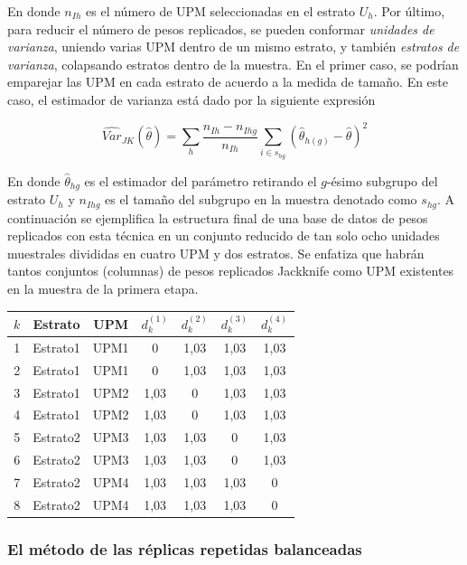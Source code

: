 \documentclass[
  12pt,
  spanish,
]{book}
\begin{document}
En donde \(n_{Ih}\) es el número de UPM seleccionadas en el estrato \(U_h\). Por último, para reducir el número de pesos replicados, se pueden conformar \emph{unidades de varianza}, uniendo varias UPM dentro de un mismo estrato, y también \emph{estratos de varianza}, colapsando estratos dentro de la muestra. En el primer caso, se podrían emparejar las UPM en cada estrato de acuerdo a la medida de tamaño. En este caso, el estimador de varianza está dado por la siguiente expresión

\[
\widehat{Var}_{JK}(\hat{\theta}) = \sum_h \frac{n_{Ih}-n_{Ihg}}{n_{Ih}} 
\sum_{i \in s_{hg}} (\hat{\theta}_{h(g)} - \hat{\theta})^2
\]

En donde \(\hat{\theta}_{hg}\) es el estimador del parámetro retirando el \(g\)-ésimo subgrupo del estrato \(U_h\) y \(n_{Ihg}\) es el tamaño del subgrupo en la muestra denotado como \(s_{hg}\). A continuación se ejemplifica la estructura final de una base de datos de pesos replicados con esta técnica en un conjunto reducido de tan solo ocho unidades muestrales divididas en cuatro UPM y dos estratos. Se enfatiza que habrán tantos conjuntos (columnas) de pesos replicados Jackknife como UPM existentes en la muestra de la primera etapa.

\begin{longtable}[]{@{}ccccccc@{}}
\toprule
\(k\) & Estrato & UPM & \(d_k^{(1)}\) & \(d_k^{(2)}\) & \(d_k^{(3)}\) & \(d_k^{(4)}\) \\
\midrule
\endhead
1 & Estrato1 & UPM1 & 0 & 1,03 & 1,03 & 1,03 \\
2 & Estrato1 & UPM1 & 0 & 1,03 & 1,03 & 1,03 \\
3 & Estrato1 & UPM2 & 1,03 & 0 & 1,03 & 1,03 \\
4 & Estrato1 & UPM2 & 1,03 & 0 & 1,03 & 1,03 \\
5 & Estrato2 & UPM3 & 1,03 & 1,03 & 0 & 1,03 \\
6 & Estrato2 & UPM3 & 1,03 & 1,03 & 0 & 1,03 \\
7 & Estrato2 & UPM4 & 1,03 & 1,03 & 1,03 & 0 \\
8 & Estrato2 & UPM4 & 1,03 & 1,03 & 1,03 & 0 \\
\bottomrule
\end{longtable}

\hypertarget{el-muxe9todo-de-las-ruxe9plicas-repetidas-balanceadas}{%
\subsubsection*{El método de las réplicas repetidas balanceadas}\label{el-muxe9todo-de-las-ruxe9plicas-repetidas-balanceadas}}
\end{document}

